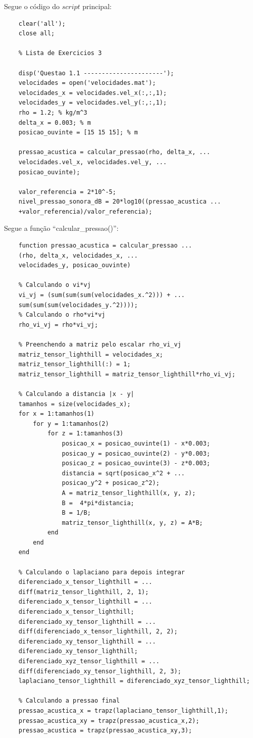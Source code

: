 Segue o código do $script$ principal:
	\begin{lstlisting}
	clear('all');
	close all;

	% Lista de Exercicios 3

	disp('Questao 1.1 ----------------------');
	velocidades = open('velocidades.mat');
	velocidades_x = velocidades.vel_x(:,:,1);
	velocidades_y = velocidades.vel_y(:,:,1);
	rho = 1.2; % kg/m^3
	delta_x = 0.003; % m
	posicao_ouvinte = [15 15 15]; % m

	pressao_acustica = calcular_pressao(rho, delta_x, ...
	velocidades.vel_x, velocidades.vel_y, ...
	posicao_ouvinte);

	valor_referencia = 2*10^-5;
	nivel_pressao_sonora_dB = 20*log10((pressao_acustica ...
	+valor_referencia)/valor_referencia);
	\end{lstlisting}

	Segue a função ``calcular\_pressao()'':
	\begin{lstlisting}
	function pressao_acustica = calcular_pressao ... 
	(rho, delta_x, velocidades_x, ...
	velocidades_y, posicao_ouvinte)

	% Calculando o vi*vj
	vi_vj = (sum(sum(sum(velocidades_x.^2))) + ... 
	sum(sum(sum(velocidades_y.^2))));
	% Calculando o rho*vi*vj
	rho_vi_vj = rho*vi_vj;

	% Preenchendo a matriz pelo escalar rho_vi_vj
	matriz_tensor_lighthill = velocidades_x;
	matriz_tensor_lighthill(:) = 1;
	matriz_tensor_lighthill = matriz_tensor_lighthill*rho_vi_vj;

	% Calculando a distancia |x - y|
	tamanhos = size(velocidades_x);
	for x = 1:tamanhos(1)
		for y = 1:tamanhos(2)
			for z = 1:tamanhos(3)
				posicao_x = posicao_ouvinte(1) - x*0.003;
				posicao_y = posicao_ouvinte(2) - y*0.003;
				posicao_z = posicao_ouvinte(3) - z*0.003;
				distancia = sqrt(posicao_x^2 + ... 
				posicao_y^2 + posicao_z^2);
				A = matriz_tensor_lighthill(x, y, z);
				B =  4*pi*distancia;
				B = 1/B;
				matriz_tensor_lighthill(x, y, z) = A*B;
			end
		end
	end

	% Calculando o laplaciano para depois integrar
	diferenciado_x_tensor_lighthill = ... 
	diff(matriz_tensor_lighthill, 2, 1);
	diferenciado_x_tensor_lighthill = ... 
	diferenciado_x_tensor_lighthill;
	diferenciado_xy_tensor_lighthill = ... 
	diff(diferenciado_x_tensor_lighthill, 2, 2);
	diferenciado_xy_tensor_lighthill = ... 
	diferenciado_xy_tensor_lighthill;
	diferenciado_xyz_tensor_lighthill = ... 
	diff(diferenciado_xy_tensor_lighthill, 2, 3);
	laplaciano_tensor_lighthill = diferenciado_xyz_tensor_lighthill;

	% Calculando a pressao final
	pressao_acustica_x = trapz(laplaciano_tensor_lighthill,1);
	pressao_acustica_xy = trapz(pressao_acustica_x,2);
	pressao_acustica = trapz(pressao_acustica_xy,3);
	\end{lstlisting}

